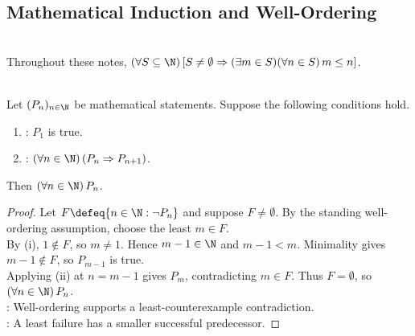 \subsection{Mathematical Induction and Well-Ordering}

\begin{assumption} \label{assump:well-ordering-positive-integers} \\
Throughout these notes, $(\forall S\subseteq\N)\,[S\neq\emptyset\Rightarrow(\exists m\in S)(\forall n\in S)\,m\leq n]$.
\end{assumption}

\begin{theorem} \label{thm:mathematical-induction} \\
Let $(P_n)_{n\in\N}$ be mathematical statements. Suppose the following conditions hold.
\begin{enumerate}[label=(\roman*)]
\setlength{\itemsep}{0pt}
\item {}: $P_1$ is true.
\item {}: $(\forall n\in\N)\,(P_n\Rightarrow P_{n+1})$.
\end{enumerate}
Then $(\forall n\in\N)\,P_n$.
\begin{proof} Let $F\defeq\{n\in\N:\neg P_n\}$ and suppose $F\neq\emptyset$. By the standing well-ordering assumption, choose the least $m\in F$.\\
By (i), $1\notin F$, so $m\neq1$. Hence $m-1\in\N$ and $m-1<m$. Minimality gives $m-1\notin F$, so $P_{m-1}$ is true.\\
Applying (ii) at $n=m-1$ gives $P_m$, contradicting $m\in F$. Thus $F=\emptyset$, so $(\forall n\in\N)\,P_n$.\\
: Well-ordering supports a least-counterexample contradiction.\\
: A least failure has a smaller successful predecessor.
\end{proof}
\end{theorem}
